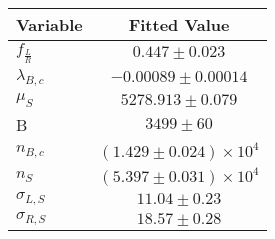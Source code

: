 \begin{tabular}[t]{lc}
\hline
Variable &Fitted Value\\
\hline\hline
$f_{\frac{L}{R}}$&$0.447\pm0.023$\\
\hline
$\lambda_{B,c}$&$-0.00089\pm0.00014$\\
\hline
$\mu_S$&$5278.913\pm0.079$\\
\hline
B&$3499\pm60$\\
\hline
$n_{B,c}$&$(1.429\pm0.024)\times 10^4$\\
\hline
$n_S$&$(5.397\pm0.031)\times 10^4$\\
\hline
$\sigma_{L, S}$&$11.04\pm0.23$\\
\hline
$\sigma_{R, S}$&$18.57\pm0.28$\\
\hline
\end{tabular}